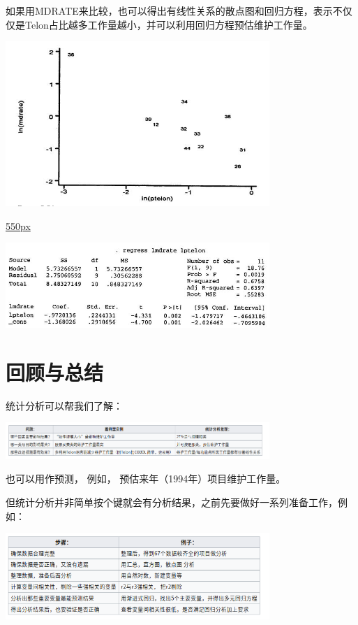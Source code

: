 如果用MDRATE来比较，也可以得出有线性关系的散点图和回归方程，表示不仅仅是Telon占比越多工作量越小，并可以利用回归方程预估维护工作量。


\includegraphics[width=10cm]{maxwell_f554.jpg}

\href{文件:maxwell_e5.34.jpg}{550px}

\includegraphics[width=10cm]{maxwell_e534.jpg}

\hypertarget{ux56deux987eux4e0eux603bux7ed3}{%
\section{回顾与总结}\label{ux56deux987eux4e0eux603bux7ed3}}

统计分析可以帮我们了解：


\includegraphics[width=10cm]{Screenshotfrom2023-01-0420-18-25.png}

也可以用作预测， 例如， 预估来年（1994年）项目维护工作量。

但统计分析并非简单按个键就会有分析结果，之前先要做好一系列准备工作，例如：


\includegraphics[width=10cm]{Screenshotfrom2023-01-0420-19-06.png}

